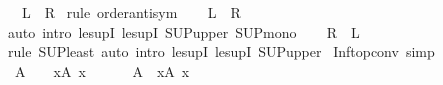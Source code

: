 \begin{isabellebody}
\ \ {\isacharparenleft}{\kern0pt}\ {\isachardoublequoteopen}{\isacharquery}{\kern0pt}L\ {\isacharequal}{\kern0pt}\ {\isacharquery}{\kern0pt}R{\isachardoublequoteclose}{\isacharparenright}{\kern0pt}\isanewline
%
\isadelimproof
%
\endisadelimproof
%
\isatagproof
{}\isamarkupfalse%
\ {\isacharparenleft}{\kern0pt}rule\ order{\isachardot}{\kern0pt}antisym{\isacharparenright}{\kern0pt}\isanewline
\ \ \isamarkupfalse%
\ {\isachardoublequoteopen}{\isacharquery}{\kern0pt}L\ {\isasymle}\ {\isacharquery}{\kern0pt}R{\isachardoublequoteclose}\isanewline
\ \ \ \ \isamarkupfalse%
\ {\isacharparenleft}{\kern0pt}auto\ intro{\isacharcolon}{\kern0pt}\ le{\isacharunderscore}{\kern0pt}supI{}\ le{\isacharunderscore}{\kern0pt}supI{}\ SUP{\isacharunderscore}{\kern0pt}upper\ SUP{\isacharunderscore}{\kern0pt}mono{\isacharparenright}{\kern0pt}\isanewline
\ \ \isamarkupfalse%
\ {\isachardoublequoteopen}{\isacharquery}{\kern0pt}R\ {\isasymle}\ {\isacharquery}{\kern0pt}L{\isachardoublequoteclose}\isanewline
\ \ \ \ \isamarkupfalse%
\ {\isacharparenleft}{\kern0pt}rule\ SUP{\isacharunderscore}{\kern0pt}least{\isacharparenright}{\kern0pt}\ {\isacharparenleft}{\kern0pt}auto\ intro{\isacharcolon}{\kern0pt}\ le{\isacharunderscore}{\kern0pt}supI{}\ le{\isacharunderscore}{\kern0pt}supI{}\ SUP{\isacharunderscore}{\kern0pt}upper{\isacharparenright}{\kern0pt}\isanewline
{}\isamarkupfalse%
%
\endisatagproof
{\isafoldproof}%
%
\isadelimproof
\isanewline
%
\endisadelimproof
\isanewline
{}\isamarkupfalse%
\ Inf{\isacharunderscore}{\kern0pt}top{\isacharunderscore}{\kern0pt}conv\ {\isacharbrackleft}{\kern0pt}simp{\isacharbrackright}{\kern0pt}{\isacharcolon}{\kern0pt}\isanewline
\ \ {\isachardoublequoteopen}{\isasymSqinter}A\ {\isacharequal}{\kern0pt}\ {\isasymtop}\ {\isasymlongleftrightarrow}\ {\isacharparenleft}{\kern0pt}{\isasymforall}x{\isasymin}A{\isachardot}{\kern0pt}\ x\ {\isacharequal}{\kern0pt}\ {\isasymtop}{\isacharparenright}{\kern0pt}{\isachardoublequoteclose}\isanewline
\ \ {\isachardoublequoteopen}{\isasymtop}\ {\isacharequal}{\kern0pt}\ {\isasymSqinter}A\ {\isasymlongleftrightarrow}\ {\isacharparenleft}{\kern0pt}{\isasymforall}x{\isasymin}A{\isachardot}{\kern0pt}\ x\ {\isacharequal}{\kern0pt}\ {\isasymtop}{\isacharparenright}{\kern0pt}{\isachardoublequoteclose}\isanewline
%
\isadelimproof
%
\endisadelimproof
%
\isatagproof
{}\isamarkupfalse%
\ {\isacharminus}{\kern0pt}\isanewline
\ \ \isamarkupfalse%

\end{isabellebody}
